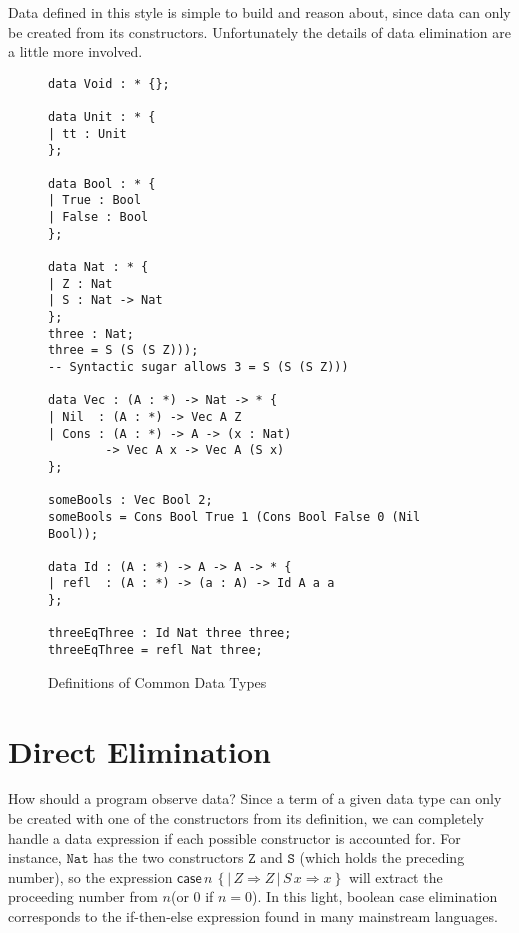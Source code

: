 Data defined in this style is simple to build and reason about, since
data can only be created from its constructors. Unfortunately the
details of data elimination are a little more involved.

\begin{figure}
\begin{lstlisting}[basicstyle={\ttfamily\small}]
data Void : * {};

data Unit : * {
| tt : Unit
};

data Bool : * {
| True : Bool
| False : Bool
};
 
data Nat : * {
| Z : Nat
| S : Nat -> Nat
};
three : Nat;
three = S (S (S Z)));
-- Syntactic sugar allows 3 = S (S (S Z)))

data Vec : (A : *) -> Nat -> * {
| Nil  : (A : *) -> Vec A Z
| Cons : (A : *) -> A -> (x : Nat)
        -> Vec A x -> Vec A (S x)
};

someBools : Vec Bool 2;
someBools = Cons Bool True 1 (Cons Bool False 0 (Nil Bool));

data Id : (A : *) -> A -> A -> * {
| refl  : (A : *) -> (a : A) -> Id A a a
};

threeEqThree : Id Nat three three;
threeEqThree = refl Nat three;
\end{lstlisting}
 \caption{Definitions of Common Data Types}
\label{fig:data-defs}
\end{figure}


\section{Direct Elimination}

How should a program observe data? Since a term of a given data type
can only be created with one of the constructors from its definition,
we can completely handle a data expression if each possible constructor
is accounted for. For instance, $\mathtt{Nat}$ has the two constructors
$\mathtt{Z}$ and $\mathtt{S}$ (which holds the preceding number),
so the expression $\mathsf{case}\,n\,\left\{ |\,Z\Rightarrow Z\,|\,S\,x\Rightarrow x\right\} $
will extract the proceeding number from $n$(or $0$ if $n=0$). In
this light, boolean case elimination corresponds to the if-then-else
expression found in many mainstream languages. 

